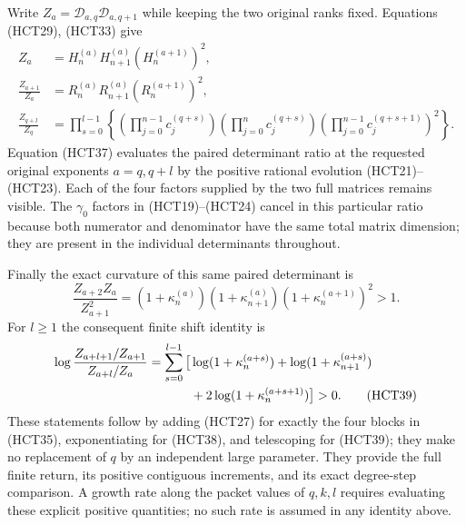 Write $Z_a=\mathcal D_{a,q}\mathcal D_{a,q+1}$ while keeping
the two original ranks fixed. Equations (HCT29), (HCT33) give
\begin{align}
 Z_a&=H_n^{(a)}H_{n+1}^{(a)}(H_n^{(a+1)})^2,\tag{HCT35}\\
 \frac{Z_{a+1}}{Z_a}
 &=R_n^{(a)}R_{n+1}^{(a)}(R_n^{(a+1)})^2,\tag{HCT36}\\
 \frac{Z_{q+l}}{Z_q}
 &=\prod_{s=0}^{l-1}
 \left\{
 \left(\prod_{j=0}^{n-1}c_j^{(q+s)}\right)
 \left(\prod_{j=0}^{n}c_j^{(q+s)}\right)
 \left(\prod_{j=0}^{n-1}c_j^{(q+s+1)}\right)^2
 \right\}.\tag{HCT37}
\end{align}
Equation (HCT37) evaluates the paired determinant ratio at the
requested original exponents $a=q,q+l$ by the positive rational
evolution (HCT21)--(HCT23). Each of the four factors supplied by
the two full matrices remains visible. The $\gamma_0$ factors
in (HCT19)--(HCT24) cancel in this particular ratio because both
numerator and denominator have the same total matrix dimension;
they are present in the individual determinants throughout.

Finally the exact curvature of this same paired determinant is
\begin{equation}\tag{HCT38}
 \frac{Z_{a+2}Z_a}{Z_{a+1}^2}
 =(1+\kappa_n^{(a)})(1+\kappa_{n+1}^{(a)})
  (1+\kappa_n^{(a+1)})^2>1.
\end{equation}
For $l\geq1$ the consequent finite shift identity is
\begin{align}
 \log\frac{Z_{a+l+1}/Z_{a+1}}{Z_{a+l}/Z_a}
 =\sum_{s=0}^{l-1}\big[&\log(1+\kappa_n^{(a+s)})
 +\log(1+\kappa_{n+1}^{(a+s)})\notag\\*
 &+2\log(1+\kappa_n^{(a+s+1)})\big]>0.\tag{HCT39}
\end{align}
These statements follow by adding (HCT27) for exactly the four
blocks in (HCT35), exponentiating for (HCT38), and telescoping
for (HCT39); they make no replacement of $q$ by an
independent large parameter. They provide the full finite return,
its positive contiguous increments, and its exact degree-step
comparison. A growth rate along the packet values of $q,k,l$
requires evaluating these explicit positive quantities; no such
rate is assumed in any identity above.
